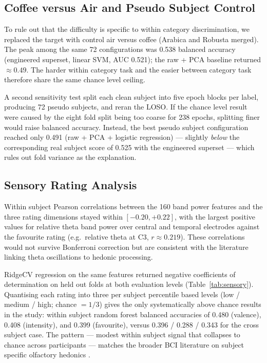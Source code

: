 \documentclass[conference]{IEEEtran}
\begin{document}
\subsection{Coffee versus Air and Pseudo Subject Control}
To rule out that the difficulty is specific to within category discrimination, we replaced the target with control air versus coffee (Arabica and Robusta merged). The peak among the same 72 configurations was 0.538 balanced accuracy (engineered superset, linear SVM, AUC 0.521); the raw + PCA baseline returned $\approx 0.49$. The harder within category task and the easier between category task therefore share the same chance level ceiling.

A second sensitivity test split each clean subject into five epoch blocks per label, producing 72 pseudo subjects, and reran the LOSO. If the chance level result were caused by the eight fold split being too coarse for 238 epochs, splitting finer would raise balanced accuracy. Instead, the best pseudo subject configuration reached only 0.491 (raw + PCA + logistic regression) --- slightly \emph{below} the corresponding real subject score of 0.525 with the engineered superset --- which rules out fold variance as the explanation.

\subsection{Sensory Rating Analysis}
\label{sec:sensory}
Within subject Pearson correlations between the 160 band power features and the three rating dimensions stayed within $[-0.20, +0.22]$, with the largest positive values for relative theta band power over central and temporal electrodes against the favourite rating (e.g.\ relative theta at C3, $r \approx 0.219$). These correlations would not survive Bonferroni correction but are consistent with the literature linking theta oscillations to hedonic processing.

RidgeCV regression on the same features returned negative coefficients of determination on held out folds at both evaluation levels (Table~\ref{tab:sensory}). Quantising each rating into three per subject percentile based levels (low / medium / high; chance $= 1/3$) gives the only systematically above chance results in the study: within subject random forest balanced accuracies of 0.480 (valence), 0.408 (intensity), and 0.399 (favourite), versus 0.396 / 0.288 / 0.343 for the cross subject case. The pattern --- modest within subject signal that collapses to chance across participants --- matches the broader BCI literature on subject specific olfactory hedonics \cite{kroupi2014}.
\end{document}
